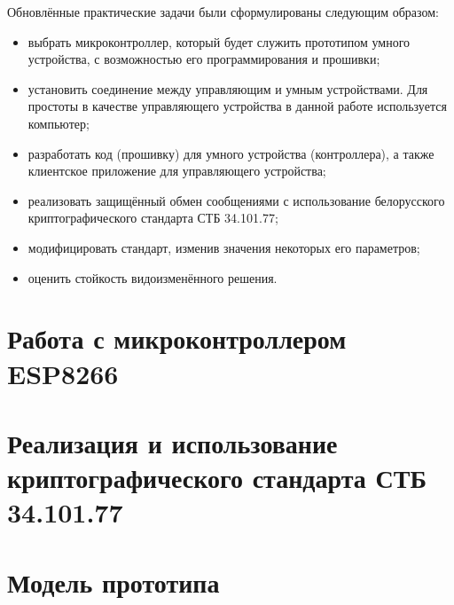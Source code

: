 	Обновлённые практические задачи были сформулированы следующим образом:
	
	\begin{itemize}
		\item выбрать микроконтроллер, который будет служить прототипом умного устройства,
		с возможностью его программирования и прошивки;
		\item установить соединение между управляющим и умным устройствами. Для простоты в качестве
		управляющего устройства в данной работе используется компьютер;
		\item разработать код (прошивку) для умного устройства (контроллера), а также клиентское
		приложение для управляющего устройства;
		\item реализовать защищённый обмен сообщениями с использование белорусского криптографического
		стандарта СТБ 34.101.77;
		\item модифицировать стандарт, изменив значения некоторых его параметров;
		\item оценить стойкость видоизменённого решения.
	\end{itemize}
	
	
	\section{Работа с микроконтроллером ESP8266}
	
	\section{Реализация и использование криптографического стандарта СТБ 34.101.77}
	
	\section{Модель прототипа}
	
